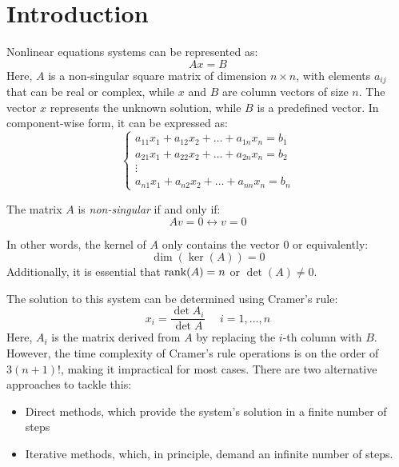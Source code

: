 \section{Introduction}

Nonlinear equations systems can be represented as:
\[Ax=B\]
Here, $A$ is a non-singular square matrix of dimension $n \times n$, with elements $a_{ij}$ that can be real or complex, while $x$ and $B$ are column vectors of size $n$.
The vector $x$ represents the unknown solution, while $B$ is a predefined vector. 
In component-wise form, it can be expressed as:
\[
\begin{cases}
    a_{11}x_1+a_{12}x_2+\dots+a_{1n}x_n=b_1 \\
    a_{21}x_1+a_{22}x_2+\dots+a_{2n}x_n=b_2 \\
    \vdots                                  \\
    a_{n1}x_1+a_{n2}x_2+\dots+a_{nn}x_n=b_n
\end{cases}
\]
\begin{definition}
    The matrix $A$ is \emph{non-singular} if and only if: 
    \[Av=0\leftrightarrow v=0\]
\end{definition}
In other words, the kernel of $A$ only contains the vector $0$ or equivalently: 
\[\dim{\left(\ker{\left(A\right)}\right)}=0\]
Additionally, it is essential that $\textnormal{rank}(A)=n$ or $\det(A)\neq 0$. 

The solution to this system can be determined using Cramer's rule:
\[x_i=\dfrac{\det{A_i}}{\det{A}} \:\:\:\:\:\: i=1,\dots,n\]
Here, $A_i$ is the matrix derived from $A$ by replacing the $i$-th column with $B$. 
However, the time complexity of Cramer's rule operations is on the order of $3(n+1)!$, making it impractical for most cases.
There are two alternative approaches to tackle this: 
\begin{itemize}
    \item Direct methods, which provide the system's solution in a finite number of steps
    \item Iterative methods, which, in principle, demand an infinite number of steps.
\end{itemize}